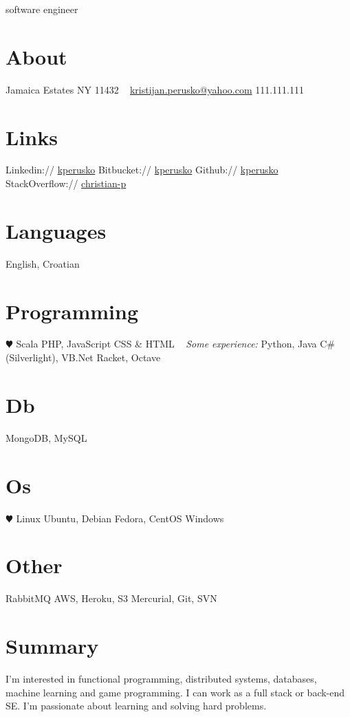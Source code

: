 \documentclass[print]{friggeri-cv}
\begin{document}
       {software engineer}


\begin{aside}
  \section{About}
    Jamaica Estates
    NY 11432
~
    \href{mailto:kristijan.perusko@yahoo.com}{kristijan.perusko@yahoo.com}
    111.111.111
  \section{Links}  
    Linkedin://  \href{https://www.linkedin.com/in/kperusko}{kperusko}
    Bitbucket:// \href{https://bitbucket.org/kperusko}{kperusko}    
    Github:// \href{https://github.com/kperuska}{kperusko}
    StackOverflow:// \href{http://stackoverflow.com/users/515053/christian-p}{christian-p}
  \section{Languages}
    English, Croatian
  \section{Programming}
    {\color{red} $\varheartsuit$} Scala
    PHP, JavaScript
    CSS \& HTML
~     
    \emph{Some experience:}
    Python, Java
    C\# (Silverlight), VB.Net
    Racket, Octave
  \section{Db}
    MongoDB, MySQL
  \section{Os}
    {\color{red} $\varheartsuit$} Linux 
    Ubuntu, Debian 
    Fedora, CentOS
    Windows
  \section{Other}
    RabbitMQ
    AWS, Heroku, S3
    Mercurial, Git, SVN
\end{aside}

\section{Summary}

I'm interested in functional programming, distributed systems, databases, machine learning and game programming. I can work as a full stack or back-end SE. I'm passionate about learning and solving hard problems.
\end{document}
